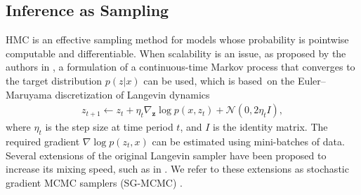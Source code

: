
\subsection{Inference as Sampling}

HMC \cite{neal2011mcmc} is an effective sampling method for models whose probability is pointwise computable and differentiable. %
When scalability is an issue, as proposed by the authors in \cite{welling2011bayesian}, a formulation of a continuous-time Markov process that converges to
the target distribution $p(z | x)$ can be used, 
which is based~on the Euler--Maruyama discretization of Langevin dynamics
\begin{eqnarray}\label{eq:sgmcmc}
z_{t+1} \leftarrow z_{t} + \eta_t \nabla_{\bm{z}} \log p(x, z_t)  + \mathcal{N}(0, 2\eta_t I),
\end{eqnarray}
where $\eta_t$ is the step size {at time period
$t$, and $I$ is the identity matrix}. The 
required gradient $\nabla \log p(z_t,x)$ can be estimated using mini-batches of data. Several extensions of the original Langevin sampler have been proposed to increase its mixing speed, 
such as in 
\cite{li2016preconditioned,li2016high,abbati2018adageo,gallego2018stochastic}. We refer to these extensions as stochastic gradient MCMC samplers (SG-MCMC) \cite{ma2015complete}.



